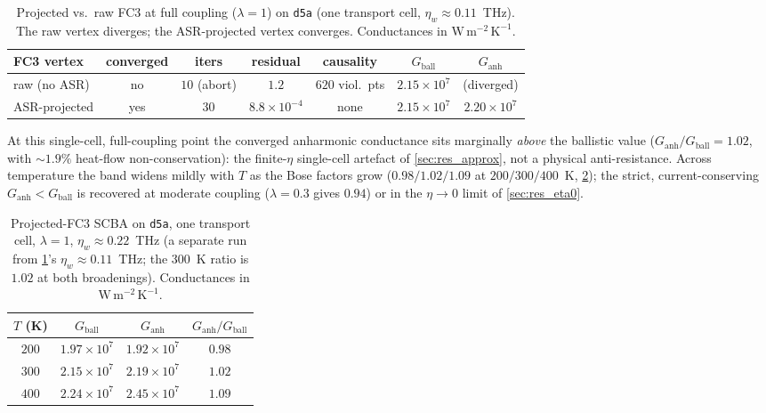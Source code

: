 \begin{table}[htb]
  \centering
  \caption{Projected vs.\ raw FC3 at full coupling ($\lambda=1$) on \texttt{d5a}
  (one transport cell, $\eta_w\approx0.11$~THz). The raw vertex diverges; the
  ASR-projected vertex converges. Conductances in $\mathrm{W\,m^{-2}\,K^{-1}}$.}
  \label{tab:res_asr_compare}
  \begin{tabular}{lcccccc}
    \toprule
    FC3 vertex & converged & iters & residual & causality & $G_\text{ball}$ & $G_\text{anh}$ \\
    \midrule
    raw (no ASR)   & no  & $10$ (abort) & $1.2$              & $620$ viol.\ pts & $2.15\times10^{7}$ & (diverged) \\
    ASR-projected  & yes & $30$         & $8.8\times10^{-4}$ & none             & $2.15\times10^{7}$ & $2.20\times10^{7}$ \\
    \bottomrule
  \end{tabular}
\end{table}

At this single-cell, full-coupling point the converged anharmonic conductance sits
marginally \emph{above} the ballistic value ($G_\mathrm{anh}/G_\mathrm{ball}=1.02$,
with $\sim1.9\%$ heat-flow non-conservation): the finite-$\eta$ single-cell artefact
of \cref{sec:res_approx}, not a physical anti-resistance. Across temperature the band
widens mildly with $T$ as the Bose factors grow ($0.98/1.02/1.09$ at $200/300/400$~K,
\cref{tab:res_anh_T}); the strict, current-conserving $G_\mathrm{anh}<G_\mathrm{ball}$
is recovered at moderate coupling ($\lambda=0.3$ gives $0.94$)
or in the $\eta\to0$ limit of \cref{sec:res_eta0}.

\begin{table}[htb]
  \centering
  \caption{Projected-FC3 SCBA on \texttt{d5a}, one transport cell, $\lambda=1$,
  $\eta_w\approx0.22$~THz (a separate run from \cref{tab:res_asr_compare}'s
  $\eta_w\approx0.11$~THz; the $300$~K ratio is $1.02$ at both broadenings).
  Conductances in $\mathrm{W\,m^{-2}\,K^{-1}}$.}
  \label{tab:res_anh_T}
  \begin{tabular}{cccc}
    \toprule
    $T$ (K) & $G_\mathrm{ball}$ & $G_\mathrm{anh}$ & $G_\mathrm{anh}/G_\mathrm{ball}$ \\
    \midrule
    $200$ & $1.97\times10^{7}$ & $1.92\times10^{7}$ & $0.98$ \\
    $300$ & $2.15\times10^{7}$ & $2.19\times10^{7}$ & $1.02$ \\
    $400$ & $2.24\times10^{7}$ & $2.45\times10^{7}$ & $1.09$ \\
    \bottomrule
  \end{tabular}
\end{table}

